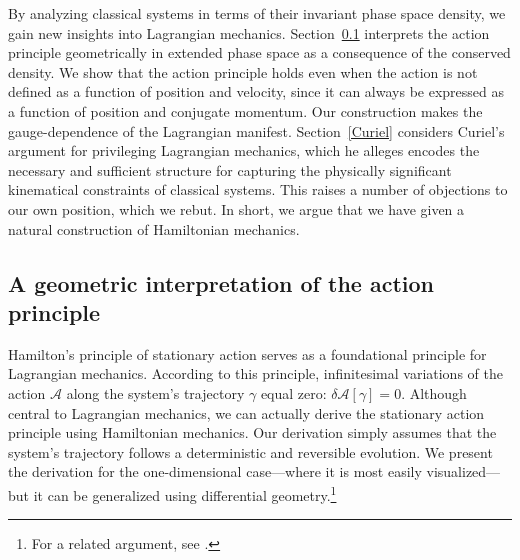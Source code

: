 \documentclass[12pt, english, twoside]{article} %
\begin{document}
By analyzing classical systems in terms of their invariant phase space density, we gain new insights into Lagrangian mechanics. Section~\ref{action} interprets the action principle geometrically in extended phase space as a consequence of the conserved density. We show that the action principle holds even when the action is not defined as a function of position and velocity, since it can always be expressed as a function of position and conjugate momentum. Our construction makes the gauge-dependence of the Lagrangian manifest. Section~\ref{Curiel} considers Curiel's \parencites*[]{Curiel} argument for privileging Lagrangian mechanics, which he alleges encodes the necessary and sufficient structure for capturing the physically significant kinematical constraints of classical systems. This raises a number of objections to our own position, which we rebut. In short, we  argue that we have given a natural construction of Hamiltonian mechanics.


\subsection{A geometric interpretation of the action principle}
\label{action}


Hamilton's principle of stationary action serves as a foundational principle for Lagrangian mechanics. According to this principle, infinitesimal variations of the action $ \mathscr{A}$ along the system's trajectory $\gamma $ equal zero: $\delta  \mathscr{A}[\gamma] = 0 $. Although central to Lagrangian mechanics, we can actually derive the stationary action principle using Hamiltonian mechanics. Our derivation simply assumes that the system's trajectory follows a deterministic and reversible evolution. We present the derivation for the one-dimensional case---where it is most easily visualized---but it can be generalized using differential geometry.\footnote{For a related argument, see \textcites[236--37, 243--45]{Arnold}.}
\end{document}
